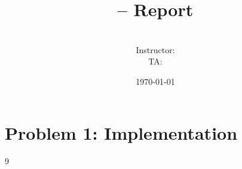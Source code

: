 \documentclass[11pt]{article}
\title{\coursename{} -- \projectname{} Report}
\author{\studentname\\
        Instructor: \instructorname \\
        TA: \taname}
\date{\today}
\theoremstyle{plain}
\theoremstyle{definition}
\begin{document}
\maketitle

\section{Problem 1: Implementation}



\begin{thebibliography}{9}

\end{thebibliography}
\end{document}
